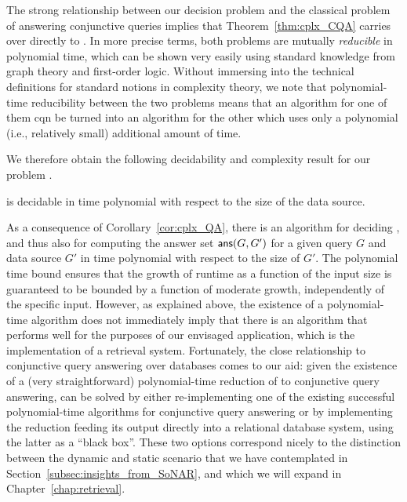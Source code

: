 The strong relationship between our decision problem 
and the classical problem of answering conjunctive queries
implies that Theorem~\ref{thm:cplx_CQA} carries over directly to .
In more precise terms, both problems are mutually \emph{reducible} in polynomial time,
which can be shown very easily using standard knowledge from graph theory and first-order logic.
Without immersing into the technical definitions for standard notions in complexity theory,
we note that polynomial-time reducibility between the two problems
means that an algorithm for one of them
cqn be turned into an algorithm for the other which uses only a polynomial
(i.e., relatively small) additional amount of time.

We therefore obtain the following decidability and complexity result
for our problem .
%
\begin{corollary}
  \label{cor:cplx_QA}
   is decidable
  in time polynomial with respect to the size of the data source.
\end{corollary}
%
As a consequence of Corollary~\ref{cor:cplx_QA}, 
there is an algorithm for deciding ,
and thus also for computing the answer set $\textsf{ans}(G,G')$
for a given query $G$ and data source $G'$ in time polynomial
with respect to the size of $G'$.
The polynomial time bound ensures that the growth of runtime
as a function of the input size is guaranteed to be bounded by a function
of moderate growth, independently of the specific input.
However, as explained above,
the existence of a polynomial-time algorithm does not immediately imply that there
is an algorithm that performs well for the purposes of our envisaged application,
which is the implementation of a retrieval system.
Fortunately, the close relationship to conjunctive query answering over databases
comes to our aid: 
given the existence of a (very straightforward) polynomial-time reduction
of  to conjunctive query answering,
 can be solved by either re-implementing one of the existing
successful polynomial-time algorithms for conjunctive query answering
or by implementing the reduction feeding its output directly into a relational database system,
using the latter as a \enquote{black box}.
These two options correspond nicely to the
distinction between the dynamic and static scenario
that we have contemplated in Section~\ref{subsec:insights_from_SoNAR},
and which we will expand in Chapter~\ref{chap:retrieval}.

